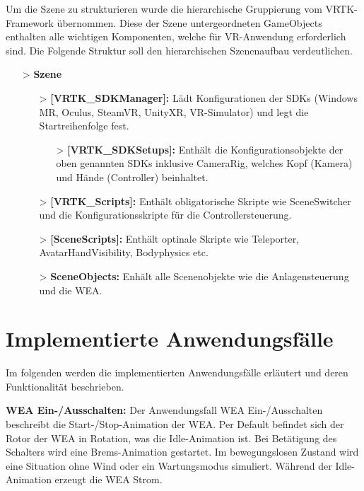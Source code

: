 Um die Szene zu strukturieren wurde die hierarchische Gruppierung vom VRTK-Framework übernommen. Diese der Szene untergeordneten GameObjects enthalten alle wichtigen Komponenten, welche für VR-Anwendung erforderlich sind. Die Folgende Struktur soll den hierarchischen Szenenaufbau verdeutlichen.

\begin{itemize}
\item[>] \textbf{Szene} 
	
	\begin{itemize}
	\item[>] \textbf{[VRTK\_SDKManager]:} Lädt Konfigurationen der SDKs (Windows MR, Oculus, SteamVR, UnityXR, VR-Simulator) und legt die Startreihenfolge fest.  	

		\begin{itemize}
			\item[>]\textbf{[VRTK\_SDKSetups]:} Enthält die Konfigurationsobjekte der oben genannten SDKs inklusive CameraRig, welches Kopf (Kamera) und Hände (Controller) beinhaltet.  		
		\end{itemize}
	
	\item[>] \textbf{[VRTK\_Scripts]:} Enthält obligatorische Skripte wie SceneSwitcher und die Konfigurationsskripte für die Controllersteuerung.
					
	\item[>] \textbf{[SceneScripts]:} Enthält optinale Skripte wie Teleporter, AvatarHandVisibility, Bodyphysics etc.
	\item[>] \textbf{SceneObjects:} Enhält alle Scenenobjekte wie die Anlagensteuerung und die WEA.
	\end{itemize}
	
\end{itemize}


\section{Implementierte Anwendungsfälle}
\label{sec:ImplementierteAnwendungsfälle}

Im folgenden werden die implementierten Anwendungsfälle erläutert und deren Funktionalität beschrieben.

\textbf{WEA Ein-/Ausschalten:} Der Anwendungsfall WEA Ein-/Ausschalten beschreibt die Start-/Stop-Animation der WEA. Per Default befindet sich der Rotor der WEA in Rotation, was die Idle-Animation ist. Bei Betätigung des Schalters wird eine Brems-Animation gestartet. Im bewegungslosen Zustand wird eine Situation ohne Wind oder ein Wartungsmodus simuliert. Während der Idle-Animation erzeugt die WEA Strom.

